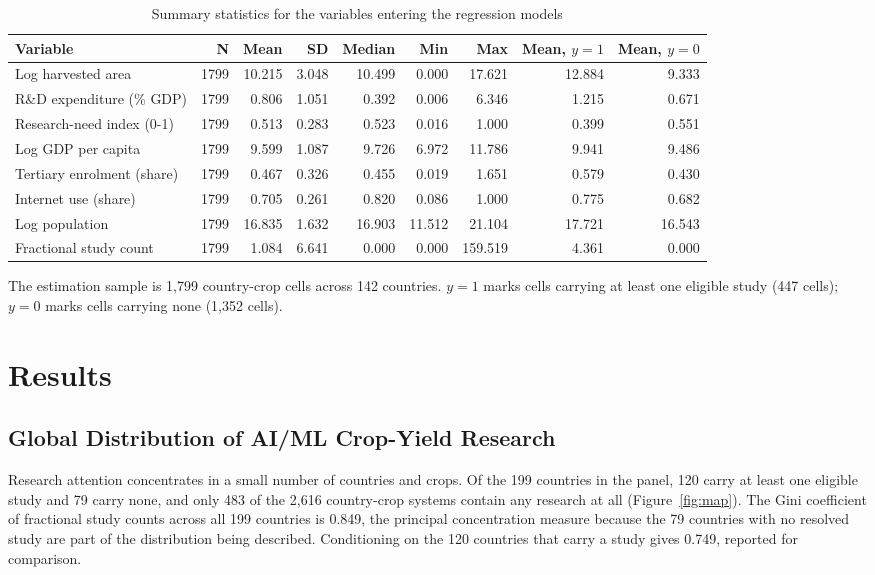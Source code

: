 \documentclass[ASNA,twocolumn]{USG}
\begin{document}
\begin{table}[!t]
\centering
\caption{Summary statistics for the variables entering the regression models}
\label{tab:summstats}
\begin{tabular*}{\textwidth}{@{\extracolsep\fill}l r r r r r r r r@{}}
\toprule
Variable & N & Mean & SD & Median & Min & Max & Mean, $y=1$ & Mean, $y=0$ \\
\midrule
Log harvested area & 1799 & 10.215 & 3.048 & 10.499 & 0.000 & 17.621 & 12.884 & 9.333 \\
R\&D expenditure (\% GDP) & 1799 & 0.806 & 1.051 & 0.392 & 0.006 & 6.346 & 1.215 & 0.671 \\
Research-need index (0-1) & 1799 & 0.513 & 0.283 & 0.523 & 0.016 & 1.000 & 0.399 & 0.551 \\
Log GDP per capita & 1799 & 9.599 & 1.087 & 9.726 & 6.972 & 11.786 & 9.941 & 9.486 \\
Tertiary enrolment (share) & 1799 & 0.467 & 0.326 & 0.455 & 0.019 & 1.651 & 0.579 & 0.430 \\
Internet use (share) & 1799 & 0.705 & 0.261 & 0.820 & 0.086 & 1.000 & 0.775 & 0.682 \\
Log population & 1799 & 16.835 & 1.632 & 16.903 & 11.512 & 21.104 & 17.721 & 16.543 \\
Fractional study count & 1799 & 1.084 & 6.641 & 0.000 & 0.000 & 159.519 & 4.361 & 0.000 \\
\bottomrule
\end{tabular*}
\begin{tablenotes}
\item[] The estimation sample is 1,799 country-crop cells across 142 countries. $y=1$ marks cells carrying at least one eligible study (447 cells); $y=0$ marks cells carrying none (1,352 cells).
\end{tablenotes}
\end{table}

\section{Results}

\subsection{Global Distribution of AI/ML Crop-Yield Research}

Research attention concentrates in a small number of countries and crops. Of the 199 countries in the panel, 120 carry at least one eligible study and 79 carry none, and
only 483 of the 2,616 country-crop systems contain any research at all (Figure~\ref{fig:map}). The
Gini coefficient of fractional study counts across all 199 countries is 0.849, the principal
concentration measure because the 79 countries with no resolved study are part of the distribution
being described. Conditioning on the 120 countries that carry a study gives 0.749, reported for
comparison.
\end{document}

